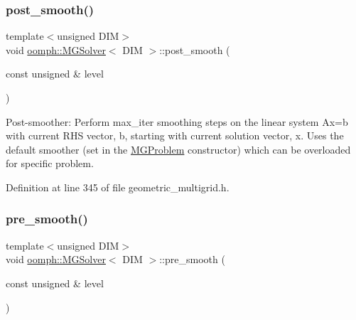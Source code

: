 \mbox{\label{classoomph_1_1MGSolver_a449bc7f6ebf7ba7bc517c7712373c68d}} 
\subsubsection{\texorpdfstring{post\+\_\+smooth()}{post\_smooth()}}
{\footnotesize\ttfamily template$<$unsigned D\+IM$>$ \\
void \hyperlink{classoomph_1_1MGSolver}{oomph\+::\+M\+G\+Solver}$<$ D\+IM $>$\+::post\+\_\+smooth (\begin{DoxyParamCaption}\item[{const unsigned \&}]{level }\end{DoxyParamCaption})\hspace{0.3cm}{\ttfamily [inline]}}



Post-\/smoother\+: Perform max\+\_\+iter smoothing steps on the linear system Ax=b with current R\+HS vector, b, starting with current solution vector, x. Uses the default smoother (set in the \hyperlink{classoomph_1_1MGProblem}{M\+G\+Problem} constructor) which can be overloaded for specific problem. 



Definition at line 345 of file geometric\+\_\+multigrid.\+h.

\mbox{\label{classoomph_1_1MGSolver_ac44511f43e0029f325f09d297d46134e}} 
\subsubsection{\texorpdfstring{pre\+\_\+smooth()}{pre\_smooth()}}
{\footnotesize\ttfamily template$<$unsigned D\+IM$>$ \\
void \hyperlink{classoomph_1_1MGSolver}{oomph\+::\+M\+G\+Solver}$<$ D\+IM $>$\+::pre\+\_\+smooth (\begin{DoxyParamCaption}\item[{const unsigned \&}]{level }\end{DoxyParamCaption})\hspace{0.3cm}{\ttfamily [inline]}}



